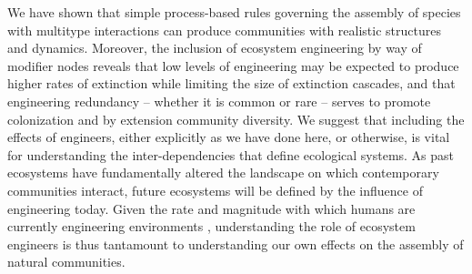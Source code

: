 \documentclass[twocolumn,preprintnumbers,amsmath,amssymb,superscriptaddress,linenumbers]{revtex4-1}
\newcommand{\rev}[1]{\textcolor{crimson}{#1}}
\begin{document}
We have shown that simple process-based rules governing the assembly of species with multitype interactions can produce communities with realistic structures and dynamics.
Moreover, the inclusion of ecosystem engineering by way of modifier nodes reveals that low levels of engineering may be expected to produce higher rates of extinction while limiting the size of extinction cascades, and that engineering redundancy -- whether it is common or rare -- serves to promote colonization and by extension community diversity.
We suggest that including the effects of engineers, either explicitly as we have done here, or otherwise, is vital for understanding the inter-dependencies that define ecological systems.
As past ecosystems have fundamentally altered the landscape on which contemporary communities interact, future ecosystems will be defined by the influence of engineering today.
Given the rate and magnitude with which humans are currently engineering environments \cite{Corlett2015}, understanding the role of ecosystem engineers is thus tantamount to understanding our own effects on the assembly of natural communities.\\
\end{document}
